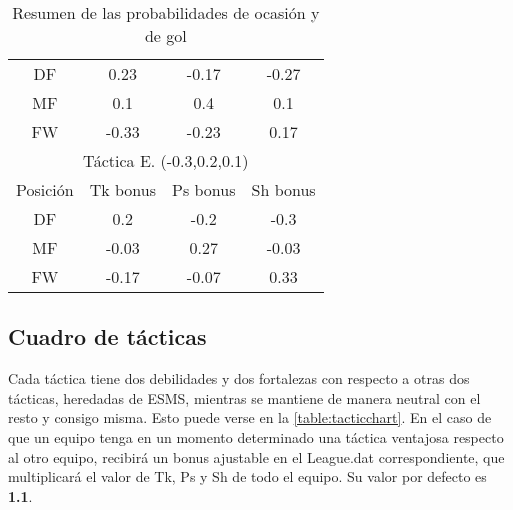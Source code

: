 \documentclass[a4paper,9pt]{article}
\begin{document}
\begin{table}
\begin{center}
\begin{tabular}{c c c c}
      \hline
      DF & 0.23 & -0.17 & -0.27 \\
      MF & 0.1 & 0.4 & 0.1 \\
      FW & -0.33 & -0.23 & 0.17 \\
      \hline\hline
      \multicolumn{4}{c}{Táctica E. (-0.3,0.2,0.1)}\\
      \hline
      Posición & Tk bonus & Ps bonus & Sh bonus\\
      \hline
      DF & 0.2 & -0.2 & -0.3 \\
      MF & -0.03 & 0.27 & -0.03 \\
      FW & -0.17 & -0.07 & 0.33 \\
      \hline\hline
    \end{tabular}
  \end{center}
  \caption{Resumen de las probabilidades de ocasión y de gol}
  \label{table:tacticbonus}
\end{table}

\subsection{Cuadro de tácticas}\label{sec:CuadroTacticas}
\def \Cverde {\cellcolor{green}}
\def \Crojo {\cellcolor{red}}
\def \Cgris {\cellcolor[rgb]{0.8,0.8,0.8}}
\def \Cblanco {\cellcolor{white}}
Cada táctica tiene dos debilidades y dos fortalezas con respecto a otras dos tácticas, heredadas de ESMS, mientras se mantiene de manera neutral con el resto y consigo misma. Esto puede verse en la \autoref{table:tacticchart}. En el caso de que un equipo tenga en un momento determinado una táctica ventajosa respecto al otro equipo, recibirá un bonus ajustable en el League.dat correspondiente, que multiplicará el valor de Tk, Ps y Sh de todo el equipo. Su valor por defecto es \textbf{1.1}.
\end{document}
